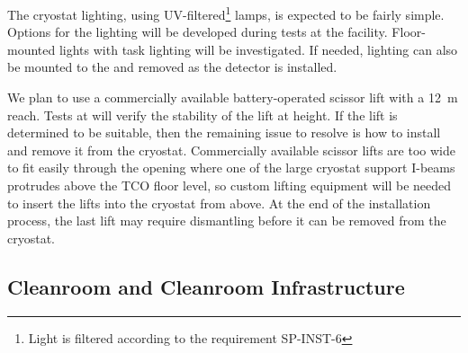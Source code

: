 The cryostat lighting, using UV-filtered\footnote{Light is filtered according to the requirement SP-INST-6}  lamps, is expected to be fairly simple. Options for the lighting will be developed during tests at the  facility.
Floor-mounted lights with task lighting will be investigated. If needed, lighting can also be mounted to the  and removed as the detector is installed.

We plan to use a commercially available battery-operated scissor lift with a \SI{12}{m} reach. Tests at  will verify the stability of the lift at height. If the lift is determined to be suitable, then the remaining issue to resolve is how to install and remove it from the cryostat. 
Commercially available scissor lifts are too wide to fit easily through the  opening where one of the large cryostat support I-beams protrudes above the TCO floor level,  so 
custom lifting equipment will be needed to insert the lifts into the cryostat from above. 
At the end of the installation process, the last lift may require dismantling before it can be removed from the cryostat.


\subsection{Cleanroom and Cleanroom Infrastructure}
\label{sec:fdsp-tc-infr-comm}

